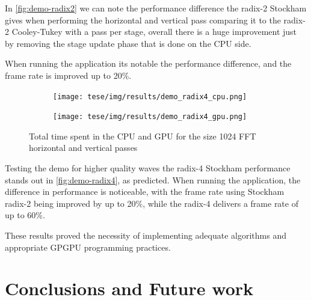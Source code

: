 \documentclass[
  oneside,
  11pt, a4paper,
  footinclude=true,
  headinclude=true,
  cleardoublepage=empty
]{scrbook}
\begin{document}
In \autoref{fig:demo-radix2} we can note the performance difference the radix-2 Stockham gives when performing the horizontal and vertical pass comparing it to the radix-2 Cooley-Tukey with a pass per stage, overall there is a huge improvement just by removing the stage update phase that is done on the CPU side.

When running the application its notable the performance difference, and the frame rate is improved up to 20\%.


\begin{figure}[H] 
    \begin{subfigure}{.5\textwidth}
        \centering
        \texttt{[image: tese/img/results/demo\_radix4\_cpu.png]}
    \end{subfigure}
    \begin{subfigure}{.5\textwidth}
        \centering
        \texttt{[image: tese/img/results/demo\_radix4\_gpu.png]}
    \end{subfigure}
    \caption{Total time spent in the CPU and GPU for the size 1024 FFT horizontal and vertical passes}
    \label{fig:demo-radix4}
\end{figure}

Testing the demo for higher quality waves the radix-4 Stockham performance stands out in \autoref{fig:demo-radix4}, as predicted. When running the application, the difference in performance is noticeable, with the frame rate using Stockham radix-2 being improved by up to 20\%, while the radix-4 delivers a frame rate of up to 60\%.

These results proved the necessity of implementing adequate algorithms and appropriate GPGPU programming practices.

\chapter{Conclusions and Future work}

% 
\end{document}
